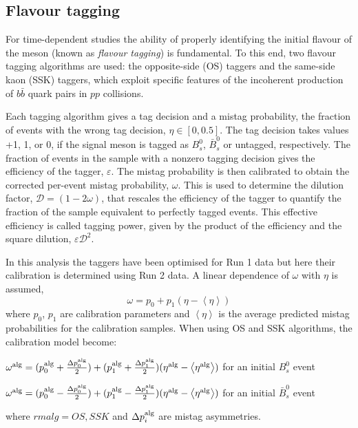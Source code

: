 \subsection{Flavour tagging}
For time-dependent studies the ability of properly identifying the initial flavour of the meson (known as \textit{flavour tagging}) is fundamental. To this end, two flavour tagging algorithms are used: the opposite-side (OS) taggers and the same-side kaon (SSK) taggers, which exploit specific features of the incoherent production of $b\bar{b}$ quark pairs in $pp$ collisions.

Each tagging algorithm gives a tag decision and a mistag probability, the fraction of events with the wrong tag decision, $\eta \in [0, 0.5]$. The tag decision takes values +1, 1, or 0, if the signal meson is tagged as $B_s^0$, $\bar{B}_s^0$ or untagged, respectively. The fraction of events in the sample with a nonzero tagging decision gives
the efficiency of the tagger, $\varepsilon$. The mistag probability is then calibrated to obtain the corrected per-event mistag probability, $\omega$. This is used to determine the dilution factor, $\mathcal{D} = (1 − 2\omega)$, that rescales the efficiency of the tagger to quantify the fraction of the sample equivalent to perfectly tagged events. This effective efficiency is called tagging power, given by the product of the efficiency and the square dilution, $\varepsilon\mathcal{D}^2$.

In this analysis the taggers have been optimised for Run 1 data but here their
calibration is determined using Run 2 data.  A linear dependence of $\omega$ with $\eta$ is assumed, 
\begin{equation}
\omega = p_0 + p_1(\eta - \left \langle \eta \right \rangle)
\end{equation}
where $p_0$, $p_1$ are calibration parameters and $\left \langle \eta \right \rangle$ is the average predicted mistag probabilities for the calibration samples. When using OS and SSK algorithms, the calibration model become:
\\
\begin{center}
$\omega^{\rm alg} = (p_0^{\rm alg} + \frac{\Delta p_0^{\rm alg}}{2}) + (p_1^{\rm alg} + \frac{\Delta p_1^{\rm alg}}{2})(\eta^{\rm alg} - \left \langle \eta^{\rm alg} \right \rangle)$ for an initial $B_s^0$ event 
\end{center}
\begin{center}
$\omega^{\rm alg} = (p_0^{\rm alg} - \frac{\Delta p_0^{\rm alg}}{2}) + (p_1^{\rm alg} - \frac{\Delta p_1^{\rm alg}}{2})(\eta^{\rm alg} - \left \langle \eta^{\rm alg} \right \rangle)$ for an initial $\bar{B}_s^0$ event 
\end{center}
where $rm alg = OS, SSK$ and $\Delta p_i^{\rm alg}$ are mistag asymmetries. 

